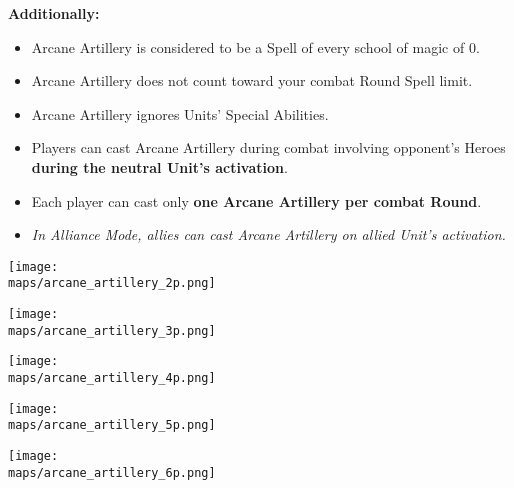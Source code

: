 \begin{multicols}{2}
\textbf{Additionally:}

\begin{itemize}
  \item Arcane Artillery is considered to be a Spell of every school of magic of  0.
  \item Arcane Artillery does not count toward your combat Round Spell limit.
  \item Arcane Artillery ignores Units' Special Abilities.
  \item Players can cast Arcane Artillery during combat involving opponent's Heroes \textbf{during the neutral Unit's activation}.
  \item Each player can cast only \textbf{one Arcane Artillery per combat Round}.
  \item \textit{In Alliance Mode, allies can cast Arcane Artillery on allied Unit's activation.}
\end{itemize}

\end{multicols}

\newpage


\begin{minipage}{0.4\paperwidth}
  \centering
  \texttt{[image: \\maps/arcane\_artillery\_2p.png]}
\end{minipage}
\vspace{1em}
\linebreak
\begin{minipage}{0.4\paperwidth}
  \centering
  \texttt{[image: \\maps/arcane\_artillery\_3p.png]}
\end{minipage}
\begin{minipage}{0.4\paperwidth}
  \centering
  \texttt{[image: \\maps/arcane\_artillery\_4p.png]}
\end{minipage}
\vspace{1em}
\linebreak
\begin{minipage}{0.4\paperwidth}
  \centering
  \texttt{[image: \\maps/arcane\_artillery\_5p.png]}
\end{minipage}
\begin{minipage}{0.4\paperwidth}
  \centering
  \texttt{[image: \\maps/arcane\_artillery\_6p.png]}
\end{minipage}
